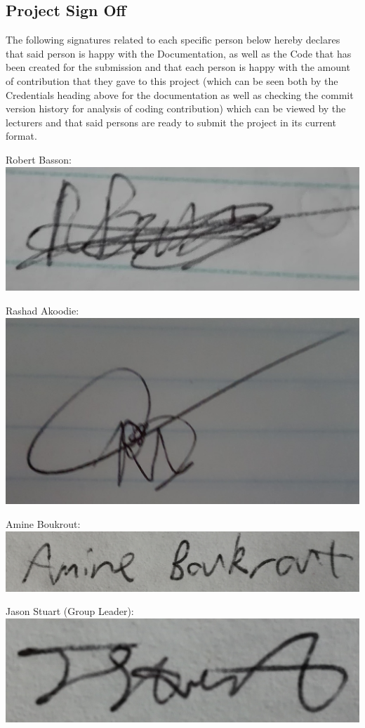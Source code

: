 \documentclass[a4paper,12pt]{article}
\begin{document}
\begin{itemize}
\section{Project Sign Off}
The following signatures related to each specific person below hereby declares that said person is happy with the Documentation, as well as the Code that has been created for the submission and that each person is happy with the amount of contribution that they gave to this project (which can be seen both by the Credentials heading above for the documentation as well as checking the commit version history for analysis of coding contribution) which can be viewed by the lecturers and that said persons are ready to submit the project in its current format.

Robert Basson: \includegraphics[scale=0.12]{Robert_Signature}

Rashad Akoodie: \includegraphics[scale=0.08]{Rashad_Signature}

Amine Boukrout: \includegraphics[scale=0.05]{Amine_Signature}

Jason Stuart (Group Leader): \includegraphics[scale=0.05]{Jason_Signature}

\end{itemize}
\end{document}
